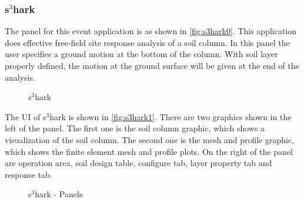 

\subsubsection{s$^3$hark}
The panel for this event application is as shown in \autoref{fig:s3hark0}. 
This application does effective free-field site response analysis of a soil column.
In this panel the user specifies a ground motion at the bottom of the column. 
With soil layer properly defined, the motion at the ground surface will be given at the end of the analysis.
\begin{figure}[!htbp]
  \caption{s$^3$hark}
  \label{fig:s3hark0}
\end{figure}

The UI of s$^3$hark is shown in \autoref{fig:s3hark1}.
There are two graphics shown in the left of the panel. The first one is the soil column graphic, 
which shows a visualization of the soil column.
The second one is the mesh and profile graphic, 
which shows the finite element mesh and profile plots.
On the right of the panel are operation area, soil design table, configure tab, layer property tab and response tab. 


\begin{figure}[!htbp]
  \caption{s$^3$hark - Panels}
  \label{fig:s3hark1}
\end{figure}

